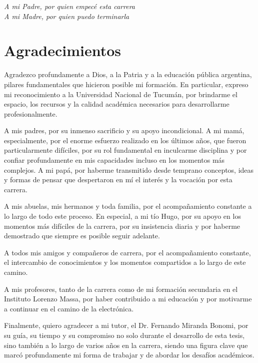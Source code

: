 \documentclass[12pt,a4paper]{report}
\begin{document}
\begin{flushright}
\textit{
A mi Padre, por quien empecé esta carrera\\
A mi Madre, por quien puedo terminarla
}
\end{flushright}

\cleardoublepage



\cleardoublepage
\thispagestyle{empty}
\newpage
\chapter*{Agradecimientos}

\vspace{1cm}

Agradezco profundamente a Dios, a la Patria y a la educación pública argentina, pilares fundamentales que hicieron posible mi formación. En particular, expreso mi reconocimiento a la Universidad Nacional de Tucumán, por brindarme el espacio, los recursos y la calidad académica necesarios para desarrollarme profesionalmente.

A mis padres, por su inmenso sacrificio y su apoyo incondicional. A mi mamá, especialmente, por el enorme esfuerzo realizado en los últimos años, que fueron particularmente difíciles, por su rol fundamental en inculcarme disciplina y por confiar profundamente en mis capacidades incluso en los momentos más complejos. A mi papá, por haberme transmitido desde temprano conceptos, ideas y formas de pensar que despertaron en mí el interés y la vocación por esta carrera.

A mis abuelas, mis hermanos y toda familia, por el acompañamiento constante a lo largo de todo este proceso. En especial, a mi tío Hugo, por su apoyo en los momentos más difíciles de la carrera, por su insistencia diaria y por haberme demostrado que siempre es posible seguir adelante.

A todos mis amigos y compañeros de carrera, por el acompañamiento constante, el intercambio de conocimientos y los momentos compartidos a lo largo de este camino.

A mis profesores, tanto de la carrera como de mi formación secundaria en el Instituto Lorenzo Massa, por haber contribuido a mi educación y por motivarme a continuar en el camino de la electrónica.

Finalmente, quiero agradecer a mi tutor, el Dr. Fernando Miranda Bonomi, por su guía, su tiempo y su compromiso no solo durante el desarrollo de esta tesis, sino también a lo largo de varios años en la carrera, siendo una figura clave que marcó profundamente mi forma de trabajar y de abordar los desafíos académicos.
\end{document}
